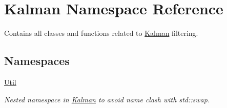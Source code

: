 \hypertarget{namespaceKalman}{}\section{Kalman Namespace Reference}
\label{namespaceKalman}


Contains all classes and functions related to \mbox{\hyperlink{namespaceKalman}{Kalman}} filtering.  


\subsection*{Namespaces}
\begin{DoxyCompactItemize}
\item 
 \mbox{\hyperlink{namespaceKalman_1_1Util}{Util}}
\begin{DoxyCompactList}\small\item\em Nested namespace in {\ttfamily \mbox{\hyperlink{namespaceKalman}{Kalman}}} to avoid name clash with {\ttfamily std\+::swap}. \end{DoxyCompactList}\end{DoxyCompactItemize}
